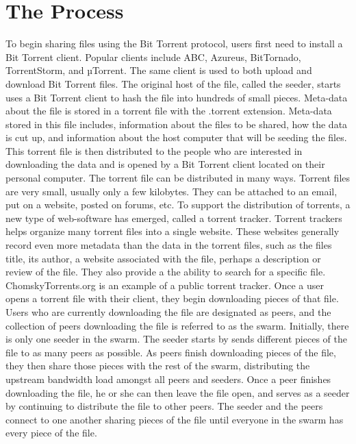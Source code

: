 \documentclass[a4paper,12pt]{report}
\begin{document}
\section{The Process}
To begin sharing files using the Bit Torrent protocol, users first need to install a Bit Torrent client.
Popular clients include ABC, Azureus, BitTornado, TorrentStorm, and µTorrent. The same client is used to both upload and download Bit Torrent files.
The original host of the file, called the seeder, starts uses a Bit Torrent client to hash the file into hundreds of small pieces.
Meta-data about the file is stored in a torrent file with the .torrent extension.
Meta-data stored in this file includes, information about the files to be shared, how the data is cut up, and information about the host computer that will be seeding the files.
This torrent file is then distributed to the people who are interested in downloading the data and is opened by a Bit Torrent client located on their personal computer.
The torrent file can be distributed in many ways.
Torrent files are very small, usually only a few kilobytes. They can be attached to an email, put on a website, posted on forums, etc.
To support the distribution of torrents, a new type of web-software has emerged, called a torrent tracker.
Torrent trackers helps organize many torrent files into a single website. These websites generally record even more metadata than the data in the torrent files, such as the files title, its author, a website associated with the file, perhaps a description or review of the file.
They also provide a the ability to search for a specific file. ChomskyTorrents.org is an example of a public torrent tracker.
Once a user opens a torrent file with their client, they begin downloading pieces of that file.
Users who are currently downloading the file are designated as peers, and the collection of peers downloading the file is referred to as the swarm.
Initially, there is only one seeder in the swarm.
The seeder starts by sends different pieces of the file to as many peers as possible. 
As peers finish downloading pieces of the file, they then share those pieces with the rest of the swarm, distributing the upstream bandwidth load amongst all peers and seeders. 
Once a peer finishes downloading the file, he or she can then leave the file open, and serves as a seeder by continuing to distribute the file to other peers.
The seeder and the peers connect to one another sharing pieces of the file until everyone in the swarm has every piece of the file.
\end{document}
